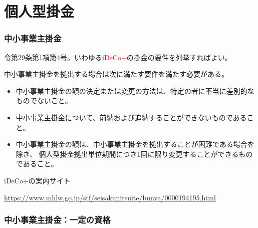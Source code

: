 \section{個人型掛金}

\subsubsection{中小事業主掛金}

\begin{itembox}[l]{}
  令第29条第1項第4号。いわゆる\textcolor{red}{iDeCo+}の掛金の要件を列挙すればよい。
\end{itembox}

\begin{sol}
  \;

  中小事業主掛金を拠出する場合は次に満たす要件を満たす必要がある。

  \begin{itemize}
    \item 中小事業主掛金の額の決定または変更の方法は、特定の者に不当に差別的なものでないこと。
    \item 中小事業主掛金について、前納および追納することができないものであること。
    \item 中小事業主掛金の額は、中小事業主掛金を拠出することが困難である場合を除き、
      個人型掛金拠出単位期間につき1回に限り変更することができるものであること。
  \end{itemize}

\end{sol}

\begin{shadebox}
  iDeCo+の案内サイト

  \url{https://www.mhlw.go.jp/stf/seisakunitsuite/bunya/0000194195.html}
\end{shadebox}

\newpage

\subsubsection{中小事業主掛金：一定の資格}


